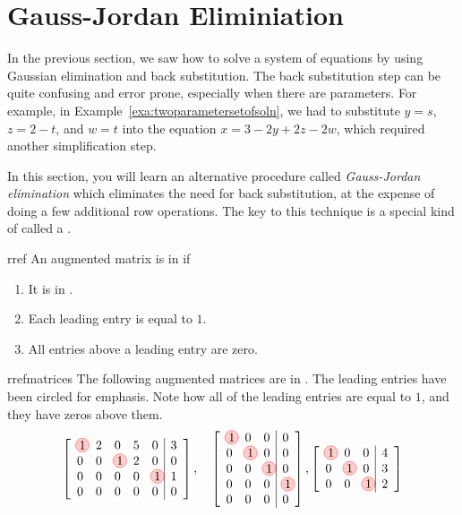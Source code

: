\section{Gauss-Jordan Eliminiation}

In the previous section, we saw how to solve a system of equations by
using Gaussian elimination and back substitution. The back
substitution step can be quite confusing and error prone, especially
when there are parameters. For example, in
Example~\ref{exa:twoparametersetofsoln}, we had to substitute $y=s$,
$z=2-t$, and $w=t$ into the equation $x=3-2y+2z-2w$, which required
another simplification step.

In this section, you will learn an alternative procedure called {\em
  Gauss-Jordan elimination} which eliminates the need for back
substitution, at the expense of doing a few additional row operations.
The key to this technique is a special kind of {\ef} called a
{\em {\rref}}.

\begin{definition}{\Rref}{rref}
  An augmented matrix is in \textbf{\rref}\eindex{\rref} if
  
  \begin{enumerate}
  \item It is in {\ef}.
    
  \item Each leading entry is equal to $1$.
    
  \item All entries above a leading entry are zero.
  \end{enumerate}
\end{definition}

\begin{example}{{\Rref}}{rrefmatrices}
The following augmented matrices are in {\rref}. The leading entries
have been circled for emphasis. Note how all of the leading entries
are equal to $1$, and they have zeros above them.
\begin{equation*}
\leftB
\begin{array}{rrrrr|r}
\circled{1} & 2 & 0 & 5 & 0 & 3 \\
0 & 0 & \circled{1} & 2 & 0 & 0 \\
0 & 0 & 0 & 0 & \circled{1} & 1 \\
0 & 0 & 0 & 0 & 0 & 0
\end{array}
\rightB,\quad\leftB
\begin{array}{rrr|r}
\circled{1} & 0 & 0 & 0 \\
0 & \circled{1} & 0 & 0 \\
0 & 0 & \circled{1} & 0 \\
0 & 0 & 0 & \circled{1} \\
0 & 0 & 0 & 0
\end{array}
\rightB , \leftB
\begin{array}{rrr|r}
\circled{1} & 0 & 0 & 4 \\
0 & \circled{1} & 0 & 3 \\
0 & 0 & \circled{1} & 2 
\end{array}
\rightB
\end{equation*}
\end{example}

